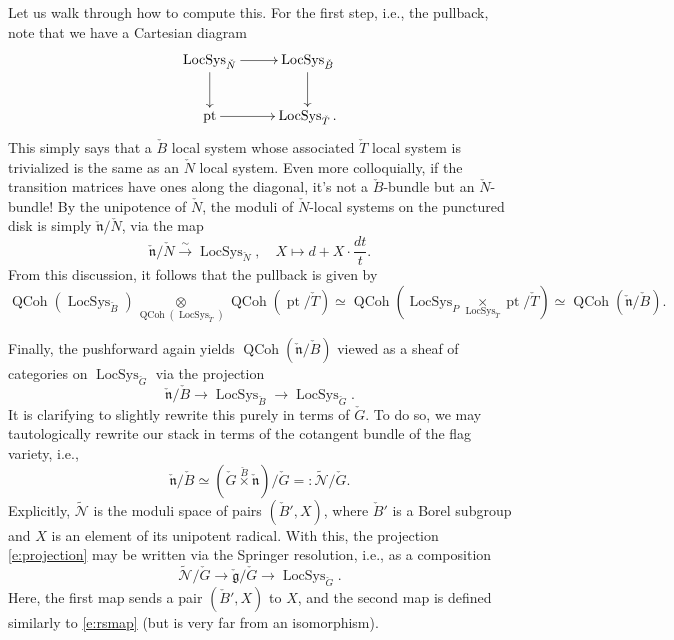 \documentclass[10pt]{amsart}
\newcommand{\LS}{\on{LocSys}_{\cG}}
\newcommand{\fg}{\mathfrak{g}}
\newcommand{\on}{\operatorname}
\theoremstyle{remark}
\newcommand{\sN}{\mathscr{N}}
\newcommand{\fn}{\mathfrak{n}}
\numberwithin{equation}{section}
\newcommand{\cfg}{\check{\fg}}
\newcommand{\cG}{\check{G}}
\newcommand{\QCoh}{\on{QCoh}}
\begin{document}
	  
	   Let us walk through how to compute this. 
	  For the first step, i.e., the pullback, note that we have a Cartesian 
	  diagram 
	  \[
	  \xymatrix{ \on{LocSys}_{\check{N}} \ar[r] \ar[d] & 
	  \on{LocSys}_{\check{B}} \ar[d] \\ \on{pt} \ar[r] & 
	  \on{LocSys}_{\check{T}}.}
	  \]
	  This simply says that a $\check{B}$ local system whose 
	  associated $\check{T}$ local system is trivialized is the same as 
	  an $\check{N}$ local 
	  system. Even more colloquially, if the transition matrices have 
	  ones along the 
	  diagonal, it's not a $\check{B}$-bundle but an $\check{N}$-bundle! By 
	  the unipotence of $\check{N}$, the moduli of $\check{N}$-local systems 
	  on the punctured disk is simply $\check{\fn} / \check{N}$, via the 
	  map 
	  \begin{equation} \label{e:rsmap}
	    \check{\fn} / \check{N} \xrightarrow{\sim}   
	    \on{LocSys}_{\check{N}}, 
	    \quad  X \mapsto d + 
	    X \cdot 
	    \frac{dt}{t}.
	  \end{equation}
	 From this discussion, it follows that the pullback is given by 
	 \begin{equation}
	 \QCoh(\on{LocSys}_{\check{B}}) \underset{ \QCoh(\on{LocSys}_{\check{T}})} 
	 \otimes \QCoh(\on{pt}/\check{T}) \simeq \QCoh( \on{LocSys}_{P}  \underset{ 
	 \on{LocSys}_{\check{T}}} \times \on{pt}/\check{T}  ) \simeq 
	 \QCoh(\check{\fn} / \check{B} ). 	 \end{equation} 
	 
	 
	 Finally, the pushforward again yields $\QCoh(\check{\fn} / \check{B} )$ 
	 viewed as a sheaf of categories on $\LS$ via the projection 
	 \begin{equation} \label{e:projection}
	     \check{\fn} / \check{B} \rightarrow \on{LocSys}_{\check{B}} 
	     \rightarrow \LS. 
	 \end{equation}
	It is clarifying to slightly rewrite this purely in terms of $\cG$. To do 
	so, we may tautologically rewrite our stack in terms of the cotangent 
	bundle of the
	 flag variety, i.e., 
	\[
	      \check{\fn} / \check{B} \simeq (\cG \overset{ \check{B}} 
	      \times \check{\fn}) / \cG =: 
	      \widetilde{\sN} / \cG.
	\]
	Explicitly, $\widetilde{\sN}$ is the moduli space of pairs $({\check{B}}', X)$, where ${\check{B}}'$ is a Borel subgroup and $X$ is an element of its unipotent radical. With this, the projection \eqref{e:projection} may be written via the Springer 
	resolution, i.e., as a composition 
	\[
	    \widetilde{\sN}/ \cG \rightarrow \cfg / \cG \rightarrow \LS.
	\]
	Here, the first map sends a pair $(\check{B}', X)$ to $X$, and  the second 
	map is defined similarly to \eqref{e:rsmap} (but is very 
	far from an isomorphism). 
	
\end{document}
